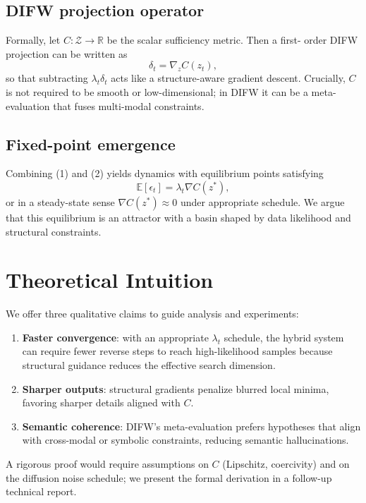 \documentclass[11pt]{article}
\begin{document}
\subsection{DIFW projection operator}
Formally, let $C: \mathcal{Z} \to \mathbb{R}$ be the scalar sufficiency metric. Then a first-
order DIFW projection can be written as
\begin{equation}
\delta_t = \nabla_z C(z_t),
\end{equation}
so that subtracting $\lambda_t \delta_t$ acts like a structure-aware gradient descent.
Crucially, $C$ is not required to be smooth or low-dimensional; in DIFW it can be a
meta-evaluation that fuses multi-modal constraints.

\subsection{Fixed-point emergence}
Combining (1) and (2) yields dynamics with equilibrium points satisfying
\begin{equation}
\mathbb{E}[\epsilon_t] = \lambda_t \nabla C(z^*),
\end{equation}
or in a steady-state sense $\nabla C(z^*)\approx 0$ under appropriate schedule. We argue that
this equilibrium is an attractor with a basin shaped by data likelihood and structural
constraints.

\section{Theoretical Intuition}
We offer three qualitative claims to guide analysis and experiments:
\begin{enumerate}
  \item \textbf{Faster convergence}: with an appropriate $\lambda_t$ schedule, the hybrid system
  can require fewer reverse steps to reach high-likelihood samples because structural guidance
  reduces the effective search dimension.
  \item \textbf{Sharper outputs}: structural gradients penalize blurred local minima, favoring
  sharper details aligned with $C$.
  \item \textbf{Semantic coherence}: DIFW's meta-evaluation prefers hypotheses that align with
  cross-modal or symbolic constraints, reducing semantic hallucinations.
\end{enumerate}
A rigorous proof would require assumptions on $C$ (Lipschitz, coercivity) and on the diffusion
noise schedule; we present the formal derivation in a follow-up technical report.
\end{document}
